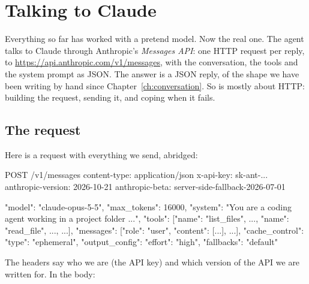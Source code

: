 \chapter{Talking to Claude}\label{ch:claude}

Everything so far has worked with a pretend model. Now the real one. The
agent talks to Claude through Anthropic's \emph{Messages API}: one HTTP
request per reply, to \url{https://api.anthropic.com/v1/messages}, with
the conversation, the tools and the system prompt as JSON. The answer is a
JSON reply, of the shape we have been writing by hand since
Chapter~\ref{ch:conversation}. So  is mostly about
HTTP: building the request, sending it, and coping when it fails.

\section{The request}

Here is a request with everything we send, abridged:

\begin{json}
POST /v1/messages
content-type: application/json
x-api-key: sk-ant-...
anthropic-version: 2026-10-21
anthropic-beta: server-side-fallback-2026-07-01

{"model": "claude-opus-5-5",
 "max_tokens": 16000,
 "system": "You are a coding agent working in a project folder ...",
 "tools": [{"name": "list_files", ...}, {"name": "read_file", ...}, ...],
 "messages": [{"role": "user", "content": [...]}, ...],
 "cache_control": {"type": "ephemeral"},
 "output_config": {"effort": "high"},
 "fallbacks": "default"}
\end{json}

The headers say who we are (the API key) and which version of the API we
are written for. In the body:

